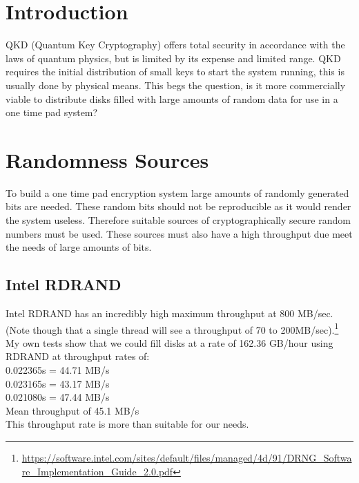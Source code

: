 \documentclass{paper}
\begin{document}
	\maketitle
	\section{Introduction}
		QKD (Quantum Key Cryptography) offers total security in accordance with the laws of quantum physics, but is limited by its expense and limited range. QKD requires the initial distribution of small keys to start the system running, this is usually done by physical means. This begs the question, is it more commercially viable to distribute disks filled with large amounts of random data for use in a one time pad system? \\
		
	
	\section{Randomness Sources}
		To build a one time pad encryption system large amounts of randomly generated bits are needed. These random bits should not be reproducible as it would render the system useless. Therefore suitable sources of cryptographically secure random numbers must be used. These sources must also have a high throughput due meet the needs of large amounts of bits.\\ 
	
		\subsection{Intel RDRAND}
			Intel RDRAND has an incredibly high maximum throughput at 800 MB/sec. (Note though that a single thread will see a throughput of 70 to 200MB/sec).\footnote{\url{https://software.intel.com/sites/default/files/managed/4d/91/DRNG_Software_Implementation_Guide_2.0.pdf}} \\
			My own tests show that we could fill disks at a rate of 162.36 GB/hour using RDRAND at throughput rates of:\\
			0.022365s = 44.71 MB/s\\
			0.023165s = 43.17 MB/s\\
			0.021080s = 47.44 MB/s\\
			Mean throughput of 45.1 MB/s\\
			This throughput rate is more than suitable for our needs.\\
			
		
			
\end{document}
